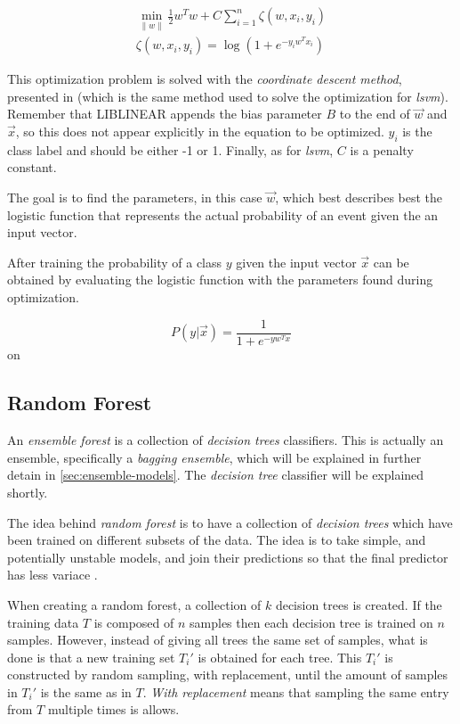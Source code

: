\documentclass[epsfig,a4paper,11pt,titlepage,twoside,openany]{book}
\begin{document}
\begin{align*}
    \min_{\|w\|} \frac{1}{2} w^T w + C \sum_{i=1}^n \zeta(w, x_i, y_i) \\ 
    \zeta(w, x_i, y_i) = \log(1+ e^{-y_i w^T x_i})
\end{align*}

This optimization problem is solved with the \textit{coordinate descent method}, presented in \cite{Hsieh:2008_lsvm_coordinated_descent} (which is the same method used to solve the optimization for \textit{lsvm}). Remember that LIBLINEAR appends the bias parameter $B$ to the end of $\vec{w}$ and $\vec{x}$, so this does not appear explicitly in the equation to be optimized. $y_i$ is the class label and should be either -1 or 1. Finally, as for \textit{lsvm}, $C$ is a penalty constant.

The goal is to find the parameters, in this case $\vec{w}$, which best describes best the logistic function that represents the actual probability of an event given the an input vector.  

After training the probability \cite{Fan:2008_liblinear} of a class $y$ given the input vector $\vec{x}$ can be obtained by evaluating the logistic function with the parameters found during optimization.

\begin{equation}
    P(y | \vec{x}) = \frac{1}{1+ e^{-y w^T x}}
\end{equation}on



\subsection{Random Forest}
\label{sec:clf-rfc}

An \textit{ensemble forest} \cite{breiman2001random_forest} is a collection of \textit{decision trees} classifiers. This is actually an ensemble, specifically a \textit{bagging ensemble}, which will be explained in further detain in \autoref{sec:ensemble-models}. The \textit{decision tree} classifier will be explained shortly.

The idea behind \textit{random forest} is to have a collection of \textit{decision trees} which have been trained on different subsets of the data. The idea is to take simple, and potentially unstable models, and join their predictions so that the final predictor has less variace \cite{breiman1996_perturbing}.

When creating a random forest, a collection of $k$ decision trees is created. If the training data $T$ is composed of $n$ samples then each decision tree is trained on $n$ samples. However, instead of giving all trees the same set of samples, what is done is that a new training set $T_i'$ is obtained for each tree. This $T_i'$ is constructed by random sampling, with replacement, until the amount of samples in $T_i'$ is the same as in $T$. \textit{With replacement} means that sampling the same entry from $T$ multiple times is allows. 
\end{document}

